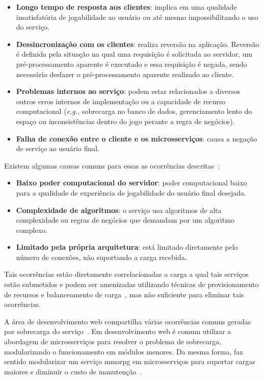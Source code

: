 \begin{itemize}
  \item \textbf{Longo tempo de resposta aos clientes}: implica em uma qualidade insatisfatória de jogabilidade ao usuário ou até mesmo impossibilitando o uso do serviço.
  \item \textbf{Dessincronização com os clientes}: realiza reversão na aplicação. Reversão é definida pela situação na qual uma requisição é solicitada ao servidor, um pré-processamento aparente é executado e essa requisição é negada, sendo necessário desfazer o pré-processamento aparente realizado ao cliente.
  \item \textbf{Problemas internos ao serviço}:  podem estar relacionados a diversos outros erros internos de implementação ou a capacidade de recurso computacional (\textit{e.g.,} sobrecarga no banco de dados, gerenciamento lento do espaço ou inconsistências dentro do jogo perante a regra de negócios).
  \item \textbf{Falha de conexão entre o cliente e os microsserviços}: causa a negação de serviço ao usuário final.
\end{itemize}

Existem algumas causas comuns para essas as ocorrências descritas~\cite{1417630}:

\begin{itemize}
  \item \textbf{Baixo poder computacional do servidor}: poder computacional baixo para a qualidade de experiência de jogabilidade do usuário final desejada.
  \item \textbf{Complexidade de algoritmos}: o serviço usa algoritmos de alta complexidade ou regras de negócios que demandam por um algoritmo complexo.
  \item \textbf{Limitado pela própria arquitetura}: está limitado diretamente pelo número de conexões, não suportando a carga recebida.
\end{itemize}

Tais ocorrências estão diretamente correlacionadas a carga a qual tais serviços estão submetidos e podem ser amenizadas utilizando técnicas de provisionamento de recursos e balanceamento de carga~\cite{1417630}, mas não suficiente para eliminar tais ocorrências.

A área de desenvolvimento web compartilha várias ocorrências comuns geradas por sobrecarga do serviço~\cite{7830692}.
%
Em desenvolvimento web é comum utilizar a abordagem de microsserviços para resolver o problema de sobrecarga, modularizando o  funcionamento em módulos menores.
%
Da mesma forma, faz sentido modularizar um serviço \ac{mmorpg} em microsserviços para suportar cargas maiores e diminuir o custo de manutenção~\cite{7515686}.



